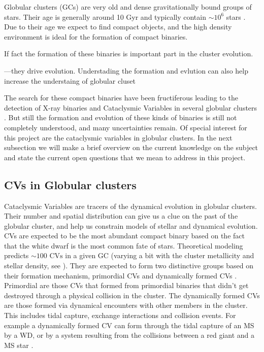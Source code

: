 Globular clusters (GCs) are very old and dense gravitationally bound groups of stars. Their age is generally around 10 Gyr \citep{meylan_internal_1997} and typically contain $\sim 10^6$ stars \citep{knigge_cataclysmic_2012}. Due to their age we expect to find compact objects, and the high density environment is ideal for the formation of compact binaries. 

If fact the formation of these binaries is important part in the cluster evolution. 


---they drive evolution. Understading the formation and evlution  can also help increase the understaing of globular cluset 


The search for these compact binaries have been fructiferous leading to the detection of X-ray binaries and Cataclysmic Variables in several globular clusters \citep[e.g.][]{maccarone_compact_2007}. But still the formation and evolution of these kinds of binaries is still not completely understood, and many uncertainties remain. Of special interest for this project are the cataclysmic variables in globular clusters. In the next subsection we will make a brief overview on the current knowledge on the subject and state the current open questions that we mean to address in this project. 


%

\subsection{CVs in Globular clusters}\label{sec:cogc}

Cataclysmic Variables are tracers of the dynamical evolution in globular clusters. Their number and spatial distribution can give us a clue on the past of the globular cluster, and help us constrain models of stellar and dynamical evolution. CVs are expected to be the most abundant compact binary based on the fact that the white dwarf is the most common fate of stars. Theoretical modeling predicts $\sim 100 \text{ CVs}$ in a given GC (varying a bit with the cluster metallicity and stellar density, see \cite{ivanova_formation_2006}). They are expected to form two distinctive groups based on their formation mechanism, primordial CVs and dynamically formed CVs \citep[e.g.][]{hut_binaries_1992}. Primordial are those CVs that formed from primordial binaries that didn't get destroyed through a physical collision in the cluster. The dynamically formed CVs are those formed via dynamical encounters with other members in the cluster. This includes tidal capture, exchange interactions and collision events. For example a dynamically formed CV can form through the tidal capture of an MS by a WD, or by a system resulting from the collisions between a red giant and a MS star \citep{ivanova_formation_2006}. 

